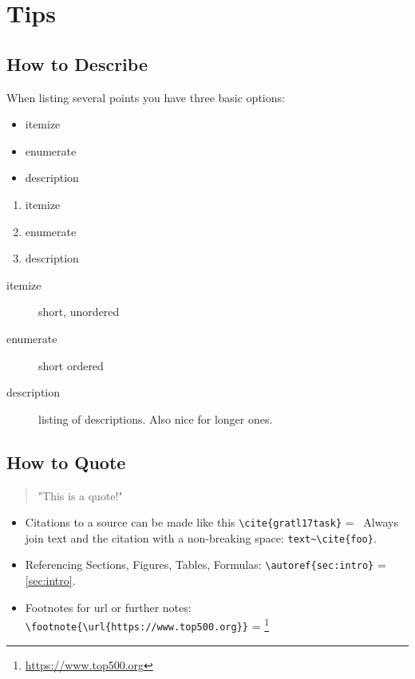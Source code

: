 \documentclass[11pt,
               a4paper,
               bibtotoc,
               idxtotoc,
               headsepline,
               footsepline,
               footexclude,
               BCOR12mm,
               DIV13,
               openany,   %
               ]
               {scrbook}
\begin{document}
\section{Tips}
\subsection{How to Describe}
\setlength{\columnsep}{30 pt}
When listing several points you have three basic options:
\begin{multicols}{3}
    \begin{itemize}
        \item itemize
        \item enumerate
        \item description
    \end{itemize}

    \vfill\null
    \columnbreak

    \begin{enumerate}
        \item itemize
        \item enumerate
        \item description
    \end{enumerate}

    \vfill\null
    \columnbreak

    \begin{description}
        \item[itemize] short, unordered
        \item[enumerate] short ordered
        \item[description] listing of descriptions. Also nice for longer ones.
    \end{description}

\end{multicols}


\subsection{How to Quote}

\begin{quote}
    "This is a quote!"
\end{quote}

\begin{itemize}
    \item Citations to a source can be made like this \verb|\cite{gratl17task}| =~\cite{gratl17task}
    \subitem Always join text and the citation with a non-breaking space: \verb|text~\cite{foo}|.
    \item Referencing Sections, Figures, Tables, Formulas: \verb|\autoref{sec:intro}| = \autoref{sec:intro}.
    \item Footnotes for url or further notes: \verb|\footnote{\url{https://www.top500.org}}| = \footnote{\url{https://www.top500.org}}
\end{itemize}
\end{document}
